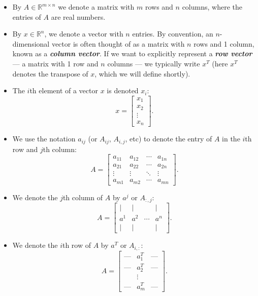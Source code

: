 \documentclass[12pt]{article}
\begin{document}
\begin{itemize}

\item By $A \in \mathbb{R}^{m \times n}$ we denote a matrix with $m$ rows
  and $n$ columns, where the entries of $A$ are real numbers.

\item By $x \in \mathbb{R}^n$, we denote a vector with $n$ entries.
  By convention, an $n$-dimensional vector is often thought of as a
  matrix with $n$ rows and 1 column, known as a \textbf{\textit{column vector}}.  
  If we want to explicitly
  represent a \textbf{\textit{row vector}} --- a matrix with 1 row and
  $n$ columns --- we typically write $x^T$ (here $x^T$ denotes the
  transpose of $x$, which we will define shortly).

\item The $i$th element of a vector $x$ is denoted $x_i$: \[ x = \left
  [ \begin{array}{c} x_1 \\ x_2 \\ \vdots \\ x_n \end{array} \right
  ]. \]

\item We use the notation $a_{ij}$ (or $A_{ij}$,
  $A_{i,j}$, etc) to denote the entry of $A$ in the $i$th row
  and $j$th column: \[A = \left [ \begin{array}{cccc} a_{11} &
  a_{12} & \cdots & a_{1n} \\ a_{21} & a_{22} & \cdots & a_{2n} \\
  \vdots & \vdots & \ddots & \vdots \\ a_{m1} & a_{m2} & \cdots &
  a_{mn} \end{array} \right ].\]

\item We denote the $j$th column of $A$ by $a^j$ or $A_{:,j}$: \[ A =
  \left [ \begin{array}{cccc} | & | &  & 
  | \\ a^1 & a^2 & \cdots & a^n \\ | & | &  & |
  \end{array} \right ]. \]

\item We denote the $i$th row of $A$ by $a^T$ or $A_{i,:}$: \[ A = \left
  [ \begin{array}{ccc} \mbox{---} & a^T_1 & 
  \mbox{---} \\   \mbox{---} & a^T_2 &  \mbox{---} \\ & \vdots & \\
  \mbox{---} & a^T_m  &  \mbox{---} \end{array} \right ]. \]


\end{itemize}
\end{document}
